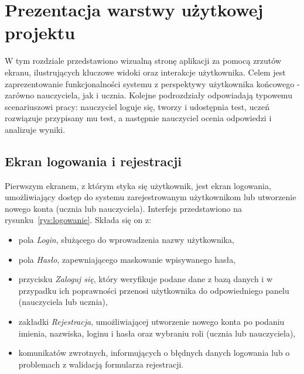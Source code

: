﻿\chapter{Prezentacja warstwy użytkowej projektu}
\label{cha:prezentacja}

W tym rozdziale przedstawiono wizualną stronę aplikacji za pomocą zrzutów ekranu, ilustrujących
kluczowe widoki oraz interakcje użytkownika. Celem jest zaprezentowanie funkcjonalności systemu
z perspektywy użytkownika końcowego - zarówno nauczyciela, jak i ucznia. Kolejne podrozdziały
odpowiadają typowemu scenariuszowi pracy: nauczyciel loguje się, tworzy i udostępnia test, uczeń
rozwiązuje przypisany mu test, a następnie nauczyciel ocenia odpowiedzi i analizuje wyniki.

\section{Ekran logowania i rejestracji}
\label{sec:logowanie}

Pierwszym ekranem, z którym styka się użytkownik, jest ekran logowania, umożliwiający dostęp do
systemu zarejestrowanym użytkownikom lub utworzenie nowego konta (ucznia lub nauczyciela). Interfejs
przedstawiono na rysunku~\ref{rys:logowanie}. Składa się on z:

\begin{itemize}
  \item pola \emph{Login}, służącego do wprowadzenia nazwy użytkownika,
  \item pola \emph{Hasło}, zapewniającego maskowanie wpisywanego hasła,
  \item przycisku \emph{Zaloguj się}, który weryfikuje podane dane z bazą danych i w przypadku ich
        poprawności przenosi użytkownika do odpowiedniego panelu (nauczyciela lub ucznia),
  \item zakładki \emph{Rejestracja}, umożliwiającej utworzenie nowego konta po podaniu imienia,
        nazwiska, loginu i hasła oraz wybraniu roli (ucznia lub nauczyciela),
  \item komunikatów zwrotnych, informujących o błędnych danych logowania lub o problemach
        z walidacją formularza rejestracji.
\end{itemize}


